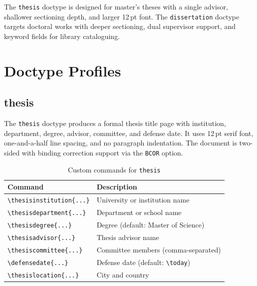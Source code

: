 The \texttt{thesis} doctype is designed for master's theses with a single
advisor, shallower sectioning depth, and larger 12\,pt font.  The
\texttt{dissertation} doctype targets doctoral works with deeper sectioning,
dual supervisor support, and keyword fields for library cataloguing.

\section{Doctype Profiles}

\subsection{thesis}

The \texttt{thesis} doctype produces a formal thesis title page with
institution, department, degree, advisor, committee, and defense date.  It
uses 12\,pt serif font, one-and-a-half line spacing, and no paragraph
indentation.  The document is two-sided with binding correction support via
the \texttt{BCOR} option.

\begin{table}[htbp]
    \centering
    \caption{Custom commands for \texttt{thesis}}
    \label{tab:thesis-commands}
    \begin{tabular}{@{} l p{8cm} @{}}
        \toprule
        \textbf{Command} & \textbf{Description} \\
        \midrule
        \texttt{\textbackslash thesisinstitution\{...\}}  & University or institution name \\
        \texttt{\textbackslash thesisdepartment\{...\}}   & Department or school name \\
        \texttt{\textbackslash thesisdegree\{...\}}       & Degree (default: Master of Science) \\
        \texttt{\textbackslash thesisadvisor\{...\}}      & Thesis advisor name \\
        \texttt{\textbackslash thesiscommittee\{...\}}    & Committee members (comma-separated) \\
        \texttt{\textbackslash defensedate\{...\}}        & Defense date (default: \texttt{\textbackslash today}) \\
        \texttt{\textbackslash thesislocation\{...\}}     & City and country \\
        \bottomrule
    \end{tabular}
\end{table}


